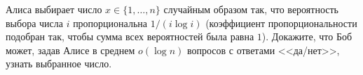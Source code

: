 Алиса выбирает число $x \in \{1, \dots, n\}$ случайным образом так, что вероятность выбора числа $i$
пропорциональна $1 / (i \log i)$ (коэффициент пропорциональности подобран так, чтобы сумма всех вероятностей
была равна $1$). Докажите, что Боб может, задав Алисе в среднем $o(\log n)$ вопросов с ответами <<да/нет>>,
узнать выбранное число.